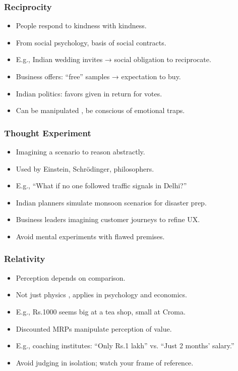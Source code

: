 \begin{frame}[fragile]\frametitle{Reciprocity}
  \begin{itemize}
    \item People respond to kindness with kindness.
    \item From social psychology, basis of social contracts.
    \item E.g., Indian wedding invites → social obligation to reciprocate.
    \item Business offers: ``free'' samples → expectation to buy.
    \item Indian politics: favors given in return for votes.
    \item Can be manipulated , be conscious of emotional traps.
  \end{itemize}
\end{frame}

\begin{frame}[fragile]\frametitle{Thought Experiment}
  \begin{itemize}
    \item Imagining a scenario to reason abstractly.
    \item Used by Einstein, Schrödinger, philosophers.
    \item E.g., ``What if no one followed traffic signals in Delhi?''
    \item Indian planners simulate monsoon scenarios for disaster prep.
    \item Business leaders imagining customer journeys to refine UX.
    \item Avoid mental experiments with flawed premises.
  \end{itemize}
\end{frame}

\begin{frame}[fragile]\frametitle{Relativity}
  \begin{itemize}
    \item Perception depends on comparison.
    \item Not just physics , applies in psychology and economics.
    \item E.g., Rs.1000 seems big at a tea shop, small at Croma.
    \item Discounted MRPs manipulate perception of value.
    \item E.g., coaching institutes: ``Only Rs.1 lakh'' vs. ``Just 2 months' salary.''
    \item Avoid judging in isolation; watch your frame of reference.
  \end{itemize}
\end{frame}

